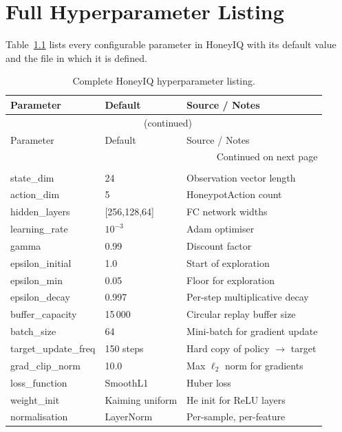 \chapter{Full Hyperparameter Listing}
\label{app:hyperparams}

Table~\ref{tab:full_hyperparams} lists every configurable parameter in
HoneyIQ with its default value and the file in which it is defined.

\begin{longtable}{p{4.2cm}p{2.8cm}p{5.5cm}}
  \caption{Complete HoneyIQ hyperparameter listing.}
  \label{tab:full_hyperparams} \\
  \toprule
  Parameter & Default & Source / Notes \\
  \midrule
  \endfirsthead
  \multicolumn{3}{c}{\tablename\ \thetable{} (continued)} \\
  \toprule
  Parameter & Default & Source / Notes \\
  \midrule
  \endhead
  \midrule
  \multicolumn{3}{r}{\footnotesize Continued on next page} \\
  \endfoot
  \bottomrule
  \endlastfoot

  \multicolumn{3}{l}{\textit{DQN (defender/dqn.py)}} \\[2pt]
  state\_dim         & 24          & Observation vector length \\
  action\_dim        & 5           & HoneypotAction count \\
  hidden\_layers     & [256,128,64] & FC network widths \\
  learning\_rate     & $10^{-3}$   & Adam optimiser \\
  gamma              & 0.99        & Discount factor \\
  epsilon\_initial   & 1.0         & Start of exploration \\
  epsilon\_min       & 0.05        & Floor for exploration \\
  epsilon\_decay     & 0.997       & Per-step multiplicative decay \\
  buffer\_capacity   & 15\,000     & Circular replay buffer size \\
  batch\_size        & 64          & Mini-batch for gradient update \\
  target\_update\_freq & 150 steps  & Hard copy of policy $\to$ target \\
  grad\_clip\_norm   & 10.0        & Max $\ell_2$ norm for gradients \\
  loss\_function     & SmoothL1    & Huber loss \\
  weight\_init       & Kaiming uniform & He init for ReLU layers \\
  normalisation      & LayerNorm   & Per-sample, per-feature \\[6pt]


\end{longtable}
